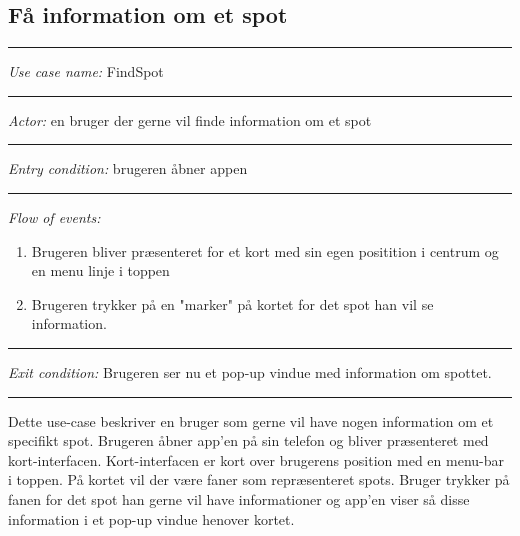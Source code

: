 \documentclass[12pt]{article}
\begin{document}
\subsection*{Få information om et spot}
\hrule\vspace{5mm}
\textit{Use case name:} FindSpot\\
\hrule\vspace{5mm}
\textit{Actor:} en bruger der gerne vil finde information om et spot\\
\hrule\vspace{5mm}
\textit{Entry condition:} brugeren åbner appen\\
\hrule\vspace{5mm}
\textit{Flow of events:}
\begin{enumerate}
\item Brugeren bliver præsenteret for et kort med sin egen positition i centrum og en menu linje i toppen
\item Brugeren trykker på en "marker" på kortet for det spot han vil se information.
\end{enumerate}
\hrule\vspace{5mm}
\textit{Exit condition:} Brugeren ser nu et pop-up vindue med information om spottet.\\
\hrule\vspace{5mm}
Dette use-case beskriver en bruger som gerne vil have nogen information om et specifikt spot. Brugeren åbner app'en på 
sin telefon og bliver præsenteret med kort-interfacen. Kort-interfacen er kort over brugerens position med en menu-bar 
i toppen. På kortet vil der være faner som repræsenteret spots. Bruger trykker på fanen for det spot han gerne vil have
informationer og app'en viser så disse information i et pop-up vindue henover kortet.
\newpage
\end{document}
